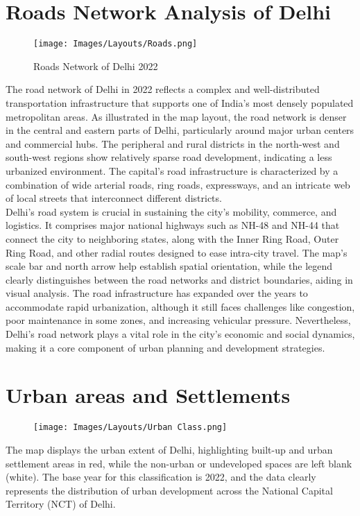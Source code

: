 \documentclass[12pt]{report}
\begin{document}
\section{Roads Network Analysis of Delhi}
\begin{figure}[H]
    \centering
    \texttt{[image: Images/Layouts/Roads.png]}
    \caption{Roads Network of Delhi 2022}
\end{figure}
The road network of Delhi in 2022 reflects a complex and well-distributed transportation infrastructure that supports one of India's most densely populated metropolitan areas. As illustrated in the map layout, the road network is denser in the central and eastern parts of Delhi, particularly around major urban centers and commercial hubs. The peripheral and rural districts in the north-west and south-west regions show relatively sparse road development, indicating a less urbanized environment. The capital's road infrastructure is characterized by a combination of wide arterial roads, ring roads, expressways, and an intricate web of local streets that interconnect different districts.\\
Delhi’s road system is crucial in sustaining the city's mobility, commerce, and logistics. It comprises major national highways such as NH-48 and NH-44 that connect the city to neighboring states, along with the Inner Ring Road, Outer Ring Road, and other radial routes designed to ease intra-city travel. The map's scale bar and north arrow help establish spatial orientation, while the legend clearly distinguishes between the road networks and district boundaries, aiding in visual analysis. The road infrastructure has expanded over the years to accommodate rapid urbanization, although it still faces challenges like congestion, poor maintenance in some zones, and increasing vehicular pressure. Nevertheless, Delhi's road network plays a vital role in the city's economic and social dynamics, making it a core component of urban planning and development strategies.

\section{Urban areas and Settlements}
\begin{figure}[H]
    \centering
    \texttt{[image: Images/Layouts/Urban Class.png]}
\end{figure}
The map displays the urban extent of Delhi, highlighting built-up and urban settlement areas in red, while the non-urban or undeveloped spaces are left blank (white). The base year for this classification is 2022, and the data clearly represents the distribution of urban development across the National Capital Territory (NCT) of Delhi.
\end{document}
